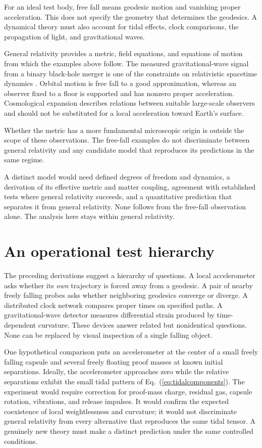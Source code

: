 \documentclass[11pt,letterpaper]{article}
\begin{document}
For an ideal test body, free fall means geodesic motion and vanishing proper acceleration. This does not specify the geometry that determines the geodesics. A dynamical theory must also account for tidal effects, clock comparisons, the propagation of light, and gravitational waves.

General relativity provides a metric, field equations, and equations of motion from which the examples above follow. The measured gravitational-wave signal from a binary black-hole merger is one of the constraints on relativistic spacetime dynamics \cite{LIGO}. Orbital motion is free fall to a good approximation, whereas an observer fixed to a floor is supported and has nonzero proper acceleration. Cosmological expansion describes relations between suitable large-scale observers and should not be substituted for a local acceleration toward Earth's surface.

Whether the metric has a more fundamental microscopic origin is outside the scope of these observations. The free-fall examples do not discriminate between general relativity and any candidate model that reproduces its predictions in the same regime.

A distinct model would need defined degrees of freedom and dynamics, a derivation of its effective metric and matter coupling, agreement with established tests where general relativity succeeds, and a quantitative prediction that separates it from general relativity. None follows from the free-fall observation alone. The analysis here stays within general relativity.

\section{An operational test hierarchy}

The preceding derivations suggest a hierarchy of questions. A local accelerometer asks whether its \emph{own} trajectory is forced away from a geodesic. A pair of nearby freely falling probes asks whether neighboring geodesics converge or diverge. A distributed clock network compares proper times on specified paths. A gravitational-wave detector measures differential strain produced by time-dependent curvature. These devices answer related but nonidentical questions. None can be replaced by visual inspection of a single falling object.

One hypothetical comparison puts an accelerometer at the center of a small freely falling capsule and several freely floating proof masses at known initial separations. Ideally, the accelerometer approaches zero while the relative separations exhibit the small tidal pattern of Eq.~(\ref{eq:tidalcomponents}). The experiment would require correction for proof-mass charge, residual gas, capsule rotation, vibrations, and release impulses. It would confirm the expected coexistence of local weightlessness and curvature; it would not discriminate general relativity from every alternative that reproduces the same tidal tensor. A genuinely new theory must make a distinct prediction under the same controlled conditions.
\end{document}
